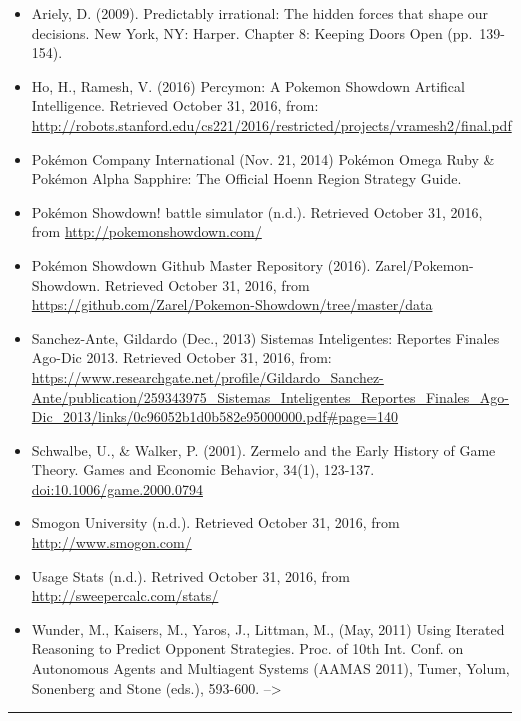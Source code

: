 \documentclass[12pt,twoside]{reedthesis}
\providecommand{\tightlist}{%
  \setlength{\itemsep}{0pt}\setlength{\parskip}{0pt}}
\begin{document}
  \begin{itemize}
  \tightlist
  \item
    Ariely, D. (2009). Predictably irrational: The hidden forces that
    shape our decisions. New York, NY: Harper. Chapter 8: Keeping Doors
    Open (pp.~139-154).
  \item
    Ho, H., Ramesh, V. (2016) Percymon: A Pokemon Showdown Artifical
    Intelligence. Retrieved October 31, 2016, from:
    \url{http://robots.stanford.edu/cs221/2016/restricted/projects/vramesh2/final.pdf}
  \item
    Pokémon Company International (Nov. 21, 2014) Pokémon Omega Ruby \&
    Pokémon Alpha Sapphire: The Official Hoenn Region Strategy Guide.
  \item
    Pokémon Showdown! battle simulator (n.d.). Retrieved October 31, 2016,
    from \url{http://pokemonshowdown.com/}
  \item
    Pokémon Showdown Github Master Repository (2016).
    Zarel/Pokemon-Showdown. Retrieved October 31, 2016, from
    \url{https://github.com/Zarel/Pokemon-Showdown/tree/master/data}
  \item
    Sanchez-Ante, Gildardo (Dec., 2013) Sistemas Inteligentes: Reportes
    Finales Ago-Dic 2013. Retrieved October 31, 2016, from:
    \url{https://www.researchgate.net/profile/Gildardo_Sanchez-Ante/publication/259343975_Sistemas_Inteligentes_Reportes_Finales_Ago-Dic_2013/links/0c96052b1d0b582e95000000.pdf\#page=140}
  \item
    Schwalbe, U., \& Walker, P. (2001). Zermelo and the Early History of
    Game Theory. Games and Economic Behavior, 34(1), 123-137.
    \url{doi:10.1006/game.2000.0794}
  \item
    Smogon University (n.d.). Retrieved October 31, 2016, from
    \url{http://www.smogon.com/}
  \item
    Usage Stats (n.d.). Retrived October 31, 2016, from
    \url{http://sweepercalc.com/stats/}
  \item
    Wunder, M., Kaisers, M., Yaros, J., Littman, M., (May, 2011) Using
    Iterated Reasoning to Predict Opponent Strategies. Proc. of 10th Int.
    Conf. on Autonomous Agents and Multiagent Systems (AAMAS 2011), Tumer,
    Yolum, Sonenberg and Stone (eds.), 593-600. --\textgreater{} \noindent
  \end{itemize}
  
  \setlength{\parindent}{-0.20in} \setlength{\leftskip}{0.20in}
  \setlength{\parskip}{8pt}
  
  \begin{center}\rule{0.5\linewidth}{\linethickness}\end{center}


\end{document}
